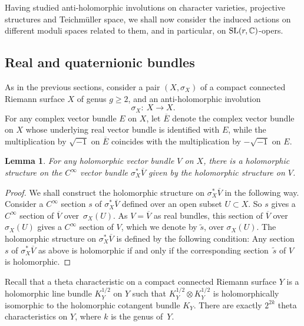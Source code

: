 \documentclass[10pt,a4paper]{amsart}
\numberwithin{equation}{section}
\newtheorem{Lemma}[Theorem]{Lemma}
\begin{document}
Having studied anti-holomorphic involutions on character varieties, projective structures and Teichm\"uller space, we shall now consider
the induced actions on different moduli spaces related to them, and in particular, on ${\rm SL}(r,\mathbb{C})$-opers.

\subsection{Real and quaternionic bundles}\label{invo}
As in the previous sections, consider a pair $(X, \sigma_X)$ of a compact connected Riemann surface $X$ of genus
$ g \geq 2$, and an anti-holomorphic involution
\begin{equation}\label{e18}
\sigma_X\colon\ X \longrightarrow X.
\end{equation}
For any complex vector bundle $E$ on $X$, let $\overline{E}$ denote the
complex vector bundle on $X$ whose underlying real vector bundle is identified with $E$, while the multiplication
by $\sqrt{-1}$ on $\overline{E}$ coincides with the multiplication by $-\sqrt{-1}$ on $E$.

\begin{Lemma}For any holomorphic vector bundle $V$ on $X$, there is a holomorphic structure
on the $C^\infty$ vector bundle $\sigma^*_X \overline{V}$ given by the holomorphic structure on $V$.
\end{Lemma}

\begin{proof}
We shall construct the holomorphic structure on $\sigma^*_X \overline{V}$ in the following way. Consider a
$C^\infty$ section $s$ of $\sigma^*_X\overline{V}$ defined over an open subset
$U \subset X$. So $s$ gives a $C^\infty$ section of $\overline{V}$ over~$\sigma_X(U)$.
As $V = \overline{V}$ as real bundles, this section of $\overline{V}$ over $\sigma_X(U)$
gives a $C^\infty$ section of $V$, which we denote by $\widetilde{s}$, over $\sigma_X(U)$.
The holomorphic structure on $\sigma^*_X \overline{V}$ is defined by the following condition:
Any section~$s$ of $\sigma^*_X\overline{V}$ as above is holomorphic if and only if the corresponding section~$\widetilde{s}$ of $V$ is holomorphic.\end{proof}

Recall that a theta characteristic on a compact connected Riemann surface $Y$ is a holomorphic line
bundle $K^{1/2}_Y$ on $Y$ such that $K^{1/2}_Y\otimes K^{1/2}_Y$ is holomorphically isomorphic to
the holomorphic cotangent bundle $K_Y$. There are exactly $2^{2k}$ theta characteristics on $Y$, where
$k$ is the genus of~$Y$.
\end{document}

